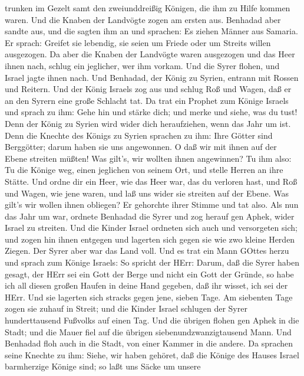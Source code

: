 trunken im Gezelt samt den zweiunddreißig Königen, die ihm zu Hilfe
kommen waren.  Und die Knaben der Landvögte zogen am ersten
aus. Benhadad aber sandte aus, und die sagten ihm an und sprachen: Es
ziehen Männer aus Samaria.  Er sprach: Greifet sie
lebendig, sie seien um Friede oder um Streits willen ausgezogen.
 Da aber die Knaben der Landvögte waren ausgezogen und das
Heer ihnen nach,  schlug ein jeglicher, wer ihm vorkam. Und
die Syrer flohen, und Israel jagte ihnen nach. Und Benhadad, der König
zu Syrien, entrann mit Rossen und Reitern.  Und der König
Israels zog aus und schlug Roß und Wagen, daß er an den Syrern eine
große Schlacht tat.  Da trat ein Prophet zum Könige Israels
und sprach zu ihm: Gehe hin und stärke dich; und merke und siehe, was du
tust! Denn der König zu Syrien wird wider dich heraufziehen, wenn das
Jahr um ist.  Denn die Knechte des Königs zu Syrien
sprachen zu ihm: Ihre Götter sind Berggötter; darum haben sie uns
angewonnen. O daß wir mit ihnen auf der Ebene streiten müßten! Was
gilt's, wir wollten ihnen angewinnen?  Tu ihm also: Tu die
Könige weg, einen jeglichen von seinem Ort, und stelle Herren an ihre
Stätte.  Und ordne dir ein Heer, wie das Heer war, das du
verloren hast, und Roß und Wagen, wie jene waren, und laß uns wider sie
streiten auf der Ebene. Was gilt's wir wollen ihnen obliegen? Er
gehorchte ihrer Stimme und tat also.  Als nun das Jahr um
war, ordnete Benhadad die Syrer und zog herauf gen Aphek, wider Israel
zu streiten.  Und die Kinder Israel ordneten sich auch und
versorgeten sich; und zogen hin ihnen entgegen und lagerten sich gegen
sie wie zwo kleine Herden Ziegen. Der Syrer aber war das Land voll.
 Und es trat ein Mann GOttes herzu und sprach zum Könige
Israels: So spricht der HErr: Darum, daß die Syrer haben gesagt, der
HErr sei ein Gott der Berge und nicht ein Gott der Gründe, so habe ich
all diesen großen Haufen in deine Hand gegeben, daß ihr wisset, ich sei
der HErr.  Und sie lagerten sich stracks gegen jene, sieben
Tage. Am siebenten Tage zogen sie zuhauf in Streit; und die Kinder
Israel schlugen der Syrer hunderttausend Fußvolks auf einen Tag.
 Und die übrigen flohen gen Aphek in die Stadt; und die
Mauer fiel auf die übrigen siebenundzwanzigtausend Mann. Und Benhadad
floh auch in die Stadt, von einer Kammer in die andere.  Da
sprachen seine Knechte zu ihm: Siehe, wir haben gehöret, daß die Könige
des Hauses Israel barmherzige Könige sind; so laßt uns Säcke um unsere
